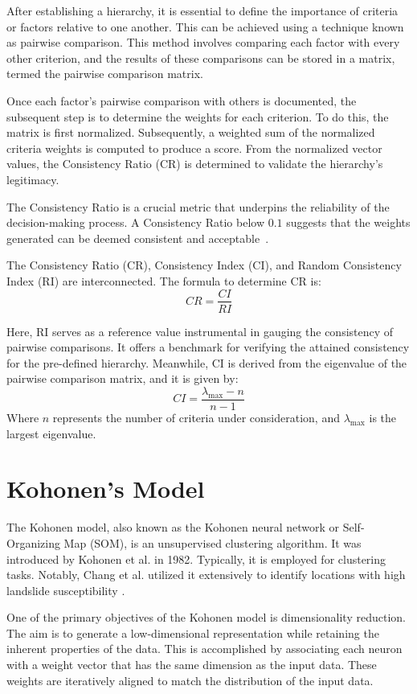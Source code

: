 \documentclass[a4paper,12pt]{Classes/RoboticsLaTeX}
\begin{document}
	After establishing a hierarchy, it is essential to define the importance of criteria or factors relative to one another. This can be achieved using a technique known as 
	pairwise comparison. This method involves comparing each factor with every other criterion, and the results of these comparisons can be stored in a matrix, termed the 
	pairwise comparison matrix.

	Once each factor's pairwise comparison with others is documented, the subsequent step is to determine the weights for each criterion. To do this, the matrix is first normalized. 
	Subsequently, a weighted sum of the normalized criteria weights is computed to produce a score. From the normalized vector values, the Consistency Ratio (CR) is determined to 
	validate the hierarchy's legitimacy.

	The Consistency Ratio is a crucial metric that underpins the reliability of the decision-making process. A Consistency Ratio below \(0.1\) suggests that the weights generated 
	can be deemed consistent and acceptable~\cite{saaty1988}.

	The Consistency Ratio (CR), Consistency Index (CI), and Random Consistency Index (RI) are interconnected. The formula to determine CR is:
	\[ CR = \frac{CI}{RI} \]

	Here, RI serves as a reference value instrumental in gauging the consistency of pairwise comparisons. It offers a benchmark for verifying the attained consistency for the pre-defined hierarchy. Meanwhile, CI is derived from the eigenvalue of the pairwise comparison matrix, and it is given by:
	\[ CI = \frac{\lambda_{\text{max}} - n}{n - 1} \]
	Where \(n\) represents the number of criteria under consideration, and \(\lambda_{\text{max}}\) is the largest eigenvalue.


	\section{Kohonen's Model}

	The Kohonen model, also known as the Kohonen neural network or Self-Organizing Map (SOM), is an unsupervised clustering algorithm. It was introduced by Kohonen et al. 
	in 1982\cite{kohonen1982}. Typically, it is employed for clustering tasks. Notably, Chang et al. utilized it extensively to identify locations with high landslide susceptibility
	\cite{chang2020}.

	One of the primary objectives of the Kohonen model is dimensionality reduction. The aim is to generate a low-dimensional representation while retaining the inherent 
	properties of the data. This is accomplished by associating each neuron with a weight vector that has the same dimension as the input data. These weights are iteratively 
	aligned to match the distribution of the input data.
\end{document}
